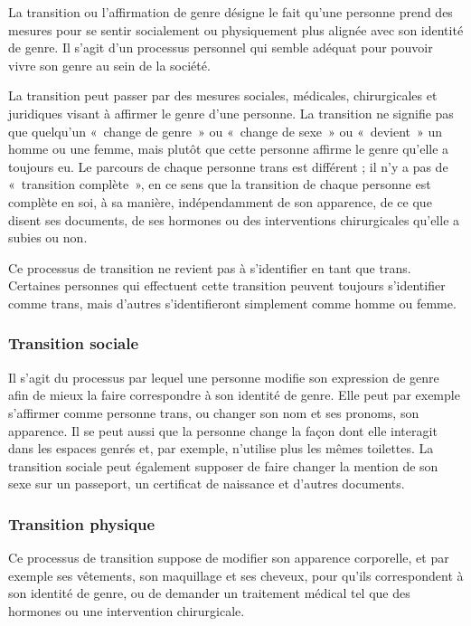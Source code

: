 \documentclass[12pt,openany]{book}
\begin{document}
\noindent La transition ou l’affirmation de genre désigne le fait qu’une personne prend des mesures pour se sentir socialement ou physiquement plus alignée avec son identité de genre. Il s’agit d’un processus personnel qui semble adéquat pour pouvoir vivre son genre au sein de la société. 

La transition peut passer par des mesures sociales, médicales, chirurgicales et juridiques visant à affirmer le genre d’une personne. La transition ne signifie pas que quelqu’un \mbox{« c}hange de genr\mbox{e »} ou \mbox{« c}hange de sex\mbox{e »} ou \mbox{« devient »} un homme ou une femme, mais plutôt que cette personne affirme le genre qu’elle a toujours eu. Le parcours de chaque personne trans est différent ; il n’y a pas de \mbox{« t}ransition complèt\mbox{e »}, en ce sens que la transition de chaque personne est complète en soi, à sa manière, indépendamment de son apparence, de ce que disent ses documents, de ses hormones ou des interventions chirurgicales qu’elle a subies ou non.

Ce processus de transition ne revient pas à s’identifier en tant que trans. Certaines personnes qui effectuent cette transition peuvent toujours s’identifier comme trans, mais d’autres s’identifieront simplement comme homme ou femme.

\subsubsection*{Transition sociale}

\noindent Il s’agit du processus par lequel une personne modifie son expression de genre afin de mieux la faire correspondre à son identité de genre. Elle peut par exemple s’affirmer comme personne trans, ou changer son nom et ses pronoms, son apparence. Il se peut aussi que la personne change la façon dont elle interagit dans les espaces genrés et, par exemple, n’utilise plus les mêmes toilettes. La transition sociale peut également supposer de faire changer la mention de son sexe sur un passeport, un certificat de naissance et d’autres documents.

\subsubsection*{Transition physique}

\noindent Ce processus de transition suppose de modifier son apparence corporelle, et par exemple ses vêtements, son maquillage et ses cheveux, pour qu’ils correspondent à son identité de genre, ou de demander un traitement médical tel que des hormones ou une intervention chirurgicale.
\end{document}

